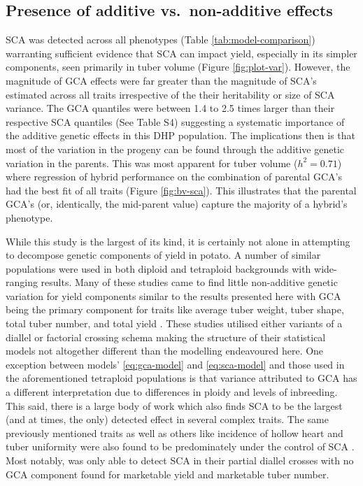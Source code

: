 \subsection{Presence of additive vs.~non-additive effects}\label{presence-of-additive-vs.-non-additive-effects}

SCA was detected across all phenotypes (Table \ref{tab:model-comparison}) warranting sufficient evidence that SCA can impact yield, especially in its simpler components, seen primarily in tuber volume (Figure \ref{fig:plot-var}). However, the magnitude of GCA effects were far greater than the magnitude of SCA's estimated across all traits irrespective of the their heritability or size of SCA variance. The GCA quantiles were between 1.4 to 2.5 times larger than their respective SCA quantiles (See Table S4) suggesting a systematic importance of the additive genetic effects in this DHP population. The implications then is that most of the variation in the progeny can be found through the additive genetic variation in the parents. This was most apparent for tuber volume (\(h^2 = 0.71\)) where regression of hybrid performance on the combination of parental GCA's had the best fit of all traits (Figure \ref{fig:bv-sca}). This illustrates that the parental GCA's (or, identically, the mid-parent value) capture the majority of a hybrid's phenotype.

While this study is the largest of its kind, it is certainly not alone in attempting to decompose genetic components of yield in potato. A number of similar populations were used in both diploid and tetraploid backgrounds with wide-ranging results. Many of these studies came to find little non-additive genetic variation for yield components similar to the results presented here with GCA being the primary component for traits like average tuber weight, tuber shape, total tuber number, and total yield \parencite{Veilleux1981, Brown1989, Neele1991}. These studies utilised either variants of a diallel or factorial crossing schema making the structure of their statistical models not altogether different than the modelling endeavoured here. One exception between models' \eqref{eq:gca-model} and \eqref{eq:sca-model} and those used in the aforementioned tetraploid populations is that variance attributed to GCA has a different interpretation due to differences in ploidy and levels of inbreeding. This said, there is a large body of work which also finds SCA to be the largest (and at times, the only) detected effect in several complex traits. The same previously mentioned traits as well as others like incidence of hollow heart and tuber uniformity were also found to be predominately under the control of SCA \parencite{Killick1977, Veilleux1981, Thompson1984, Haynes2001}. Most notably, \parencite{Tai1976} was only able to detect SCA in their partial diallel crosses with no GCA component found for marketable yield and marketable tuber number.

